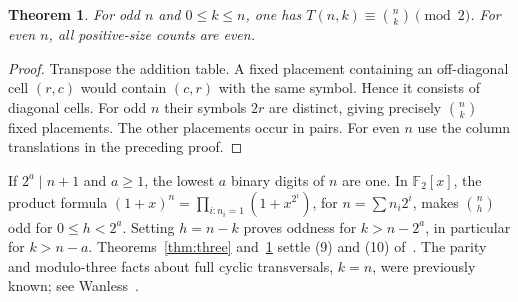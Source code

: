 \documentclass[11pt]{article}
\newtheorem{theorem}{Theorem}
\newcommand{\F}{\mathbb F}
\begin{document}
\begin{theorem}\label{thm:parity}
For odd $n$ and $0\le k\le n$, one has $T(n,k)\equiv\binom nk\pmod2$. For even $n$, all positive-size counts are even.
\end{theorem}
\begin{proof}
Transpose the addition table. A fixed placement containing an off-diagonal cell $(r,c)$ would contain $(c,r)$ with the same symbol. Hence it consists of diagonal cells. For odd $n$ their symbols $2r$ are distinct, giving precisely $\binom nk$ fixed placements. The other placements occur in pairs. For even $n$ use the column translations in the preceding proof.
\end{proof}
If $2^a\mid n+1$ and $a\ge1$, the lowest $a$ binary digits of $n$ are one. In $\F_2[x]$, the product formula $(1+x)^n=\prod_{i:n_i=1}(1+x^{2^i})$, for $n=\sum n_i2^i$, makes $\binom nh$ odd for $0\le h<2^a$. Setting $h=n-k$ proves oddness for $k>n-2^a$, in particular for $k>n-a$. Theorems~\ref{thm:three} and~\ref{thm:parity} settle (9) and (10) of~\cite{trump}. The parity and modulo-three facts about full cyclic transversals, $k=n$, were previously known; see Wanless~\cite[Thms.~10--11]{wanless}.
\end{document}
